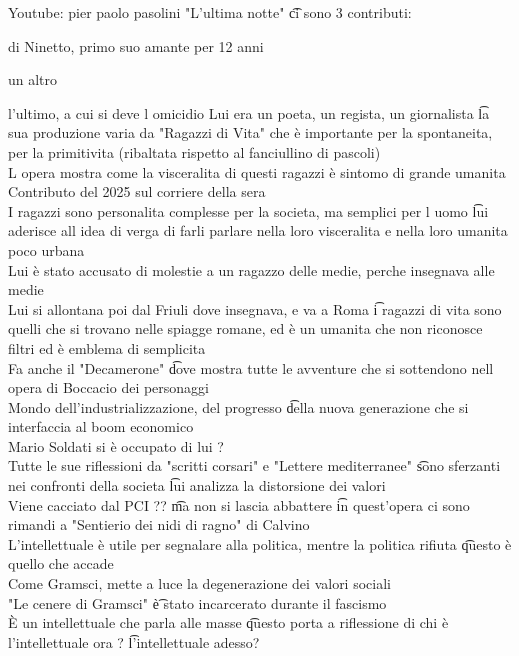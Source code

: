 \documentclass[12pt]{article}
\begin{document}
\s[Pasolini]
Youtube: pier paolo pasolini "L'ultima notte" \t ci sono 3 contributi: 
\bi
  \item di Ninetto, primo suo amante per 12 anni
  \item un altro
  \item l'ultimo, a cui si deve l omicidio
\ei
Lui era un poeta, un regista, un giornalista \t la sua produzione varia da "Ragazzi di Vita" che è importante per la spontaneita, per la primitivita (ribaltata rispetto al fanciullino di pascoli) \\
L opera mostra come la visceralita di questi ragazzi è sintomo di grande umanita \\
Contributo del 2025 sul corriere della sera \\
I ragazzi sono personalita complesse per la societa, ma semplici per l uomo \t lui aderisce all idea di verga di farli parlare nella loro visceralita e nella loro umanita poco urbana \\
Lui è stato accusato di molestie a un ragazzo delle medie, perche insegnava alle medie \\
Lui si allontana poi dal Friuli dove insegnava, e va a Roma \t i ragazzi di vita sono quelli che si trovano nelle spiagge romane, ed è un umanita che non riconosce filtri ed è emblema di semplicita \\
Fa anche il "Decamerone" \t dove mostra tutte le avventure che si sottendono nell opera di Boccacio dei personaggi \\
Mondo dell'industrializzazione, del progresso \t della nuova generazione che si interfaccia al boom economico \\
Mario Soldati si è occupato di lui ? \\
Tutte le sue riflessioni da "scritti corsari" e "Lettere mediterranee" \t sono sferzanti nei confronti della societa \t lui analizza la distorsione dei valori \\
Viene cacciato dal PCI ?? \t ma non si lascia abbattere \t in quest'opera ci sono rimandi a "Sentierio dei nidi di ragno" di Calvino \\
L'intellettuale è utile per segnalare alla politica, mentre la politica rifiuta \t questo è quello che accade \\
Come Gramsci, mette a luce la degenerazione dei valori sociali \\
"Le cenere di Gramsci" \t è stato incarcerato durante il fascismo \\
È un intellettuale che parla alle masse \t questo porta a riflessione di chi è l'intellettuale ora ? \t l'intellettuale adesso? \\
\end{document}
